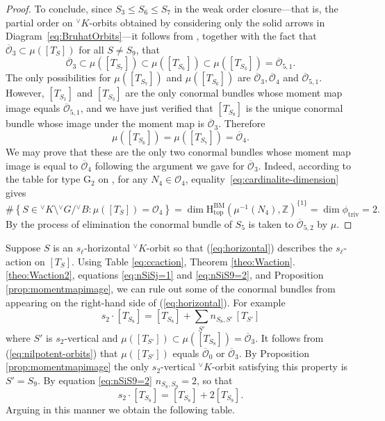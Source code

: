 \documentclass[a4paper, 11pt]{article}
\begin{document}
\begin{proof}
To conclude, since $S_3 \leq S_6 \leq S_7$ in the weak order
closure—that is, the partial order on ${}^{\vee}K$-orbits obtained by
considering only the solid arrows in Diagram~\ref{eq:BruhatOrbits}—it
follows from \cite[Proposition 2.6]{CNT}, together with the fact that 
$\overline{\mathcal{O}}_3 \subset \mu([T_{S}])$ for all $S \neq S_9$, that
\[
\overline{\mathcal{O}}_3 \subset \mu([T_{S_7}]) \subset \mu([T_{S_6}])
\subset \mu([T_{S_3}]) = \overline{\mathcal{O}}_{5,1}. 
\] 
The only possibilities for $\mu([T_{S_7}])$ and $\mu([T_{S_6}])$ are
$\overline{\mathcal{O}}_3, \overline{\mathcal{O}}_4$ and
$\overline{\mathcal{O}}_{5,1}$. 
However, $[T_{S_1}]$ and $[T_{S_3}]$ are the only conormal bundles
whose moment map image equals $\overline{\mathcal{O}}_{5,1}$,  and we
have just verified that $[T_{S_8}]$ is the unique conormal bundle
whose image under the moment map is $\overline{\mathcal{O}}_3$.   
Therefore
\[
\mu([T_{S_6}]) = \mu([T_{S_7}]) = \overline{\mathcal{O}}_4.
\]
We may prove that these are the only two conormal bundles whose moment
map image is equal to \( \overline{\mathcal{O}}_4 \) following the
argument we gave for $\overline{\mathcal{O}}_{3}$. 
Indeed, according to the table for type \( \mathrm{G}_2 \) on \cite[page
  427]{Carter85}, for any \( N_4 \in \mathcal{O}_4 \),  
equality~\eqref{eq:cardinalite-dimension} gives
\[
\#\left\{ S \in {}^\vee K \setminus {}^\vee G / {}^\vee B : \mu([T_S])
= \mathcal{O}_4 \right\} 
= \dim \mathrm{H}_{\mathrm{top}}^{\mathrm{BM}}(\mu^{-1}(N_4), \mathbb{Z})^{\{1\}} 
= \dim \phi_{\mathrm{triv}} = 2.
\]
By the process of elimination the conormal bundle of $S_5$ is taken to
$\overline{\mathcal{O}}_{5,2}$ by $\mu$.    
\end{proof}
Suppose $S$ is an $s_{\ell}$-horizontal ${^\vee}K$-orbit so that
(\ref{eq:horizontal}) describes the $s_{\ell}$-action on $[T_S]$.
Using Table \ref{eq:ccaction},
Theorem \ref{theo:Waction}.\ref{theo:Waction2}, equations \eqref{eq:nSiSj=1} and
\eqref{eq:nSiS9=2}, and Proposition \ref{prop:momentmapimage},
we can rule out some of the conormal bundles
from appearing on the right-hand side of (\ref{eq:horizontal}).
For example
$$s_{2}\cdot [T_{S_{8}}] = [T_{S_{8}}] + \sum_{S'} n_{S_{8},S'} \,
[T_{S'}]$$ 
where $S'$ is $s_{2}$-vertical and $\mu([T_{S'}]) \subset \mu([T_{S_{8}}]) =
\overline{\mathcal{O}}_{3}$.  It follows from
(\ref{eq:nilpotent-orbits}) that $\mu([T_{S'}])$ equals
$\overline{\mathcal{O}}_{0}$ or $\overline{\mathcal{O}}_{3}$.  By
Proposition \ref{prop:momentmapimage} the only $s_{2}$-vertical
${^\vee}K$-orbit satisfying this property is $S' = S_{9}$.  By equation
\eqref{eq:nSiS9=2} $n_{S_{8}, S_{9}} = 2$, so that
$$s_{2}\cdot [T_{S_{8}}] = [T_{S_8}]+2[T_{S_9}].$$
Arguing in this manner we obtain the following table. 
\end{document}
